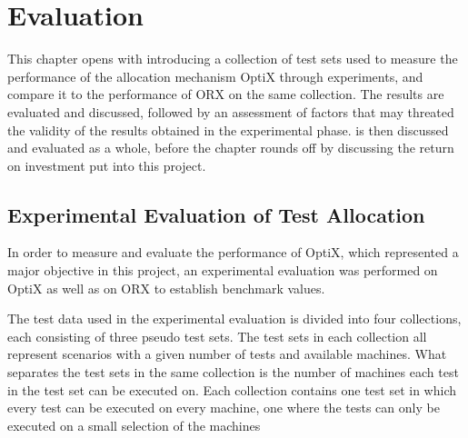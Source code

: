 \section{Evaluation}\label{chapter.discussion}
\thispagestyle{plain}

This chapter opens with introducing a collection of test sets used to measure the performance of the allocation mechanism OptiX through experiments, and compare it to the performance of ORX on the same collection. The results are evaluated and discussed, followed by an assessment of factors that may threated the validity of the results obtained in the experimental phase. \toolname \space is then discussed and evaluated as a whole, before the chapter rounds off by discussing the return on investment put into this project.


\subsection{Experimental Evaluation of Test Allocation}

In order to measure and evaluate the performance of OptiX, which represented a major objective in this project, an experimental evaluation was performed on OptiX as well as on ORX to establish benchmark values.

The test data used in the experimental evaluation is divided into four collections, each consisting of three pseudo test sets. The test sets in each collection all represent scenarios with a given number of tests and available machines. What separates the test sets in the same collection is the number of machines each test in the test set can be executed on. Each collection contains one test set in which every test can be executed on every machine, one where the tests can only be executed on a small selection of the machines 

